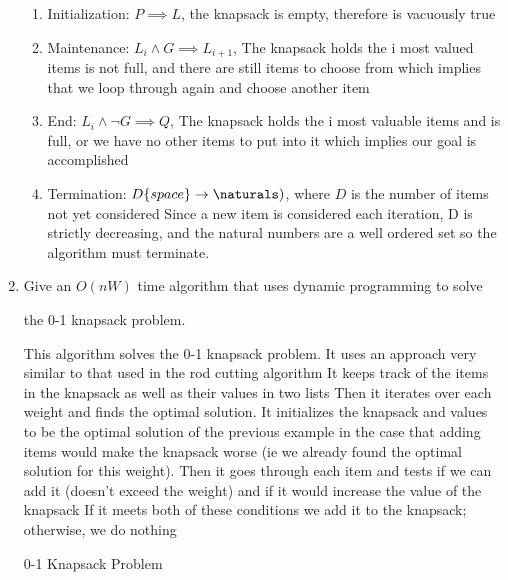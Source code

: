 \documentclass{article}
\begin{document}
\begin{enumerate}
    \begin{enumerate}

        \item Initialization: $P \implies L$, the knapsack is empty, therefore is vacuously true
        \item Maintenance: $L_{i} \land G \implies L_{i+1}$, The knapsack holds the i most valued items
 is not full, and there are still items to choose from which implies that we loop through again and choose another item
        \item End: $L_{i} \land \neg G \implies Q$, The knapsack holds the i most valuable items
 and is full, or we have no other items to put into it which implies our goal is accomplished
        \item Termination: $D\{space\} \rightarrow \naturals)$, where $D$ is the number of items not yet considered
 Since a new item is considered each iteration, D is strictly decreasing, and the natural numbers are a well ordered set
 so the algorithm must terminate.

    \end{enumerate}

    

    \item Give an $O(nW)$ time algorithm that uses dynamic programming to solve

        the 0-1 knapsack problem.

        

This algorithm solves the 0-1 knapsack problem. It uses an approach very similar to that used in the rod cutting algorithm
 It keeps track of the items in the knapsack as well as their values in two lists
 Then it iterates over each weight and finds the optimal solution. It initializes the knapsack and values to be the optimal solution of the previous example in the case that adding items would make the knapsack worse (ie
 we already found the optimal solution for this weight). Then it goes through each item and tests if we can add it (doesn't exceed the weight) and if it would increase the value of the knapsack
 If it meets both of these conditions we add it to the knapsack; otherwise, we do nothing
        

\begin{algorithm}

    \caption{0-1 Knapsack Problem}\label{knap}

    \begin{algorithmic}[1]



\end{algorithmic}
\end{algorithm}
\end{enumerate}
\end{document}
